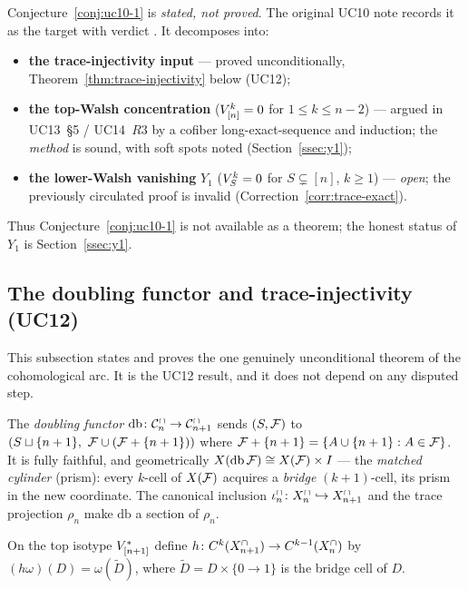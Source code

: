 \begin{status}
Conjecture~\ref{conj:uc10-1} is \emph{stated, not proved}. The original
UC10 note records it as the target with verdict . It
decomposes into:
\begin{itemize}[leftmargin=1.4em]
\item \textbf{the trace-injectivity input} --- proved unconditionally,
  Theorem~\ref{thm:trace-injectivity} below (UC12);
\item \textbf{the top-Walsh concentration} ($V_{[n]}^{k}=0$ for
  $1\le k\le n-2$) --- argued in UC13~\S5 / UC14~$R3$ by a
  cofiber long-exact-sequence and induction; the \emph{method} is
  sound, with soft spots noted (Section~\ref{ssec:y1});
\item \textbf{the lower-Walsh vanishing} $Y_1$ ($V_{S}^{k}=0$ for
  $S\subsetneq[n]$, $k\ge1$) --- \emph{open}; the previously
  circulated proof is invalid (Correction~\ref{corr:trace-exact}).
\end{itemize}
Thus Conjecture~\ref{conj:uc10-1} is not available as a theorem; the
honest status of $Y_1$ is Section~\ref{ssec:y1}.
\end{status}

\subsection{The doubling functor and trace-injectivity (UC12)}
\label{ssec:uc12}

This subsection states and proves the one genuinely unconditional
theorem of the cohomological arc. It is the UC12 result, and it does
not depend on any disputed step.

\begin{definition}
\label{def:doubling}
The \emph{doubling functor} $\mathrm{db}\colon\mathcal{C}^{\cap}_n\to\mathcal
C^{\cap}_{n+1}$ sends $(S,\mathcal{F})$ to
$(S\sqcup\{n+1\},\ \F\cup(\F+\{n+1\}))$ where $\mathcal{F}+\{n+1\}=\{A\cup\{n+1\}
:A\in\mathcal{F}\}$. It is fully faithful, and geometrically
$X(\mathrm{db}\,\mathcal{F})\cong X(\mathcal{F})\times I$ --- the \emph{matched cylinder}
(prism): every $k$-cell of $X(\mathcal{F})$ acquires a \emph{bridge}
$(k+1)$-cell, its prism in the new coordinate. The canonical inclusion
$\iota^{\cap}_n\colon X^{\cap}_n\hookrightarrow X^{\cap}_{n+1}$ and the trace
projection $\rho_n$ make $\mathrm{db}$ a section of $\rho_n$.
\end{definition}

\begin{construction}
\label{constr:bridge}
On the top isotype $V_{[n+1]}^{*}$ define $h\colon
C^{k}(X^{\cap}_{n+1})\to C^{k-1}(X^{\cap}_n)$ by $(h\omega)(D)=\omega
(\widetilde D)$, where $\widetilde D=D\times\{0\!\to\!1\}$ is the
bridge cell of $D$.
\end{construction}

